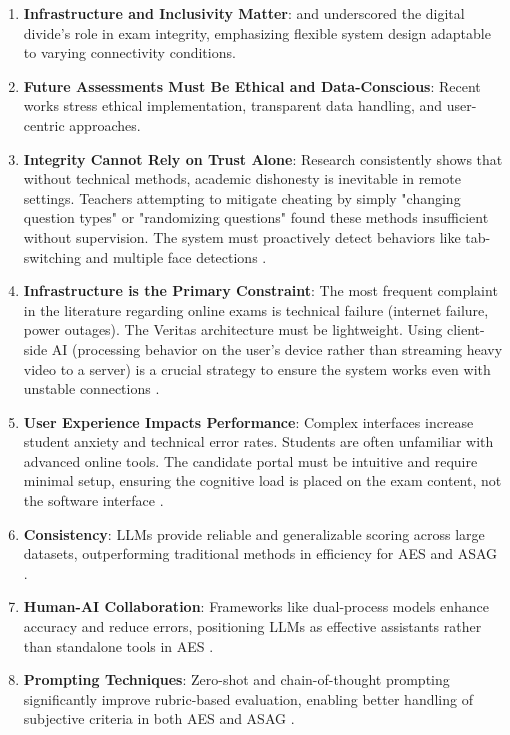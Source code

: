 \begin{enumerate}
    \item \textbf{Infrastructure and Inclusivity Matter}: \citet{Kurniati2023} and \citet{Ali2025} underscored the digital divide’s role in exam integrity, emphasizing flexible system design adaptable to varying connectivity conditions.
    \item \textbf{Future Assessments Must Be Ethical and Data-Conscious}: Recent works \citep{Kundu2024,Mansour2024,MizumotoEguchi2023} stress ethical implementation, transparent data handling, and user-centric approaches.
    \item \textbf{Integrity Cannot Rely on Trust Alone}: Research consistently shows that without technical methods, academic dishonesty is inevitable in remote settings. Teachers attempting to mitigate cheating by simply "changing question types" or "randomizing questions" found these methods insufficient without supervision. The system must proactively detect behaviors like tab-switching and multiple face detections \citep{Topuz2022,JiaHe2021,TiongLee2021}.
    \item \textbf{Infrastructure is the Primary Constraint}: The most frequent complaint in the literature regarding online exams is technical failure (internet failure, power outages). The Veritas architecture must be lightweight. Using client-side AI (processing behavior on the user's device rather than streaming heavy video to a server) is a crucial strategy to ensure the system works even with unstable connections \citep{Hussein2020,Ali2025,Topuz2022}.
    \item \textbf{User Experience Impacts Performance}: Complex interfaces increase student anxiety and technical error rates. Students are often unfamiliar with advanced online tools. The candidate portal must be intuitive and require minimal setup, ensuring the cognitive load is placed on the exam content, not the software interface \citep{Rahim2020,UcaGunes2024}.
    \item \textbf{Consistency}: LLMs provide reliable and generalizable scoring across large datasets, outperforming traditional methods in efficiency for AES and ASAG \citep{MizumotoEguchi2023,Schneider2024}.
    \item \textbf{Human-AI Collaboration}: Frameworks like dual-process models enhance accuracy and reduce errors, positioning LLMs as effective assistants rather than standalone tools in AES \citep{Xiao2024}.
    \item \textbf{Prompting Techniques}: Zero-shot and chain-of-thought prompting significantly improve rubric-based evaluation, enabling better handling of subjective criteria in both AES and ASAG \citep{MizumotoEguchi2023,Schneider2024}.
\end{enumerate}
